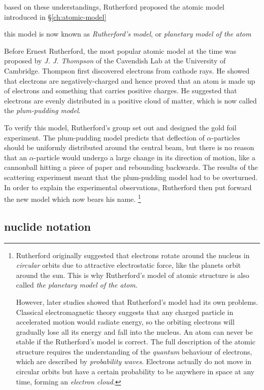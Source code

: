 based on these understandings, Rutherford proposed the atomic model introduced in \S\ref{ch:atomic-model}

this model is now known as \emph{Rutherford's model}, or \emph{planetary model of the atom}

	Before Ernest Rutherford, the most popular atomic model at the time was proposed by \emph{J. J. Thompson} of the Cavendish Lab at the University of Cambridge. Thompson first discovered electrons from cathode rays. He showed that electrons are negatively-charged and hence proved that an atom is made up of electrons and something that carries positive charges. He suggested that electrons are evenly distributed in a positive cloud of matter, which is now called the \emph{plum-pudding model}.
	
	To verify this model, Rutherford's group set out and designed the gold foil experiment. The plum-pudding model predicts that deflection of $\alpha$-particles should be uniformly distributed around the central beam, but there is no reason that an $\alpha$-particle would undergo a large change in its direction of motion, like a cannonball hitting a piece of paper and rebounding backwards. The results of the scattering experiment meant that the plum-pudding model had to be overturned. In order to explain the experimental observations, Rutherford then put forward the new model which now bears his name.
\footnote{
	 Rutherford originally suggested that electrons rotate around the nucleus in \emph{circular} orbits due to attractive electrostatic force, like the planets orbit around the sun. This is why Rutherford's model of atomic structure is also called \emph{the planetary model of the atom}.
	 
	 However, later studies showed that Rutherford's model had its own problems. Classical electromagnetic theory suggests that any charged particle in accelerated motion would radiate energy, so the orbiting electrons will gradually lose all its energy and fall into the nucleus. An atom can never be stable if the Rutherford's model is correct. The full description of the atomic structure requires the understanding of the \emph{quantum} behaviour of electrons, which are described by \emph{probability waves}. Electrons actually do not move in circular orbits but have a certain probability to be anywhere in space at any time, forming an \emph{electron cloud}.
 }




\subsection{nuclide notation}

